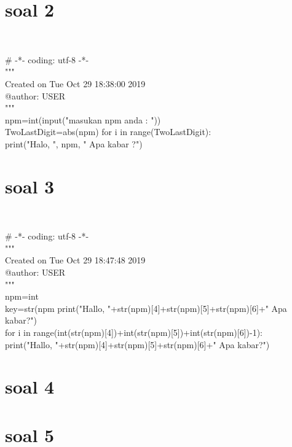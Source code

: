 \begin{enumerate}
\section*{soal 2}\\
\begin{lstlistening}
# -*- coding: utf-8 -*-\\
"""\\
Created on Tue Oct 29 18:38:00 2019\\

@author: USER\\
"""\\

npm=int(input("masukan npm anda : "))\\
TwoLastDigit=abs(npm)%
for i in range(TwoLastDigit):\\
    print("Halo, ", npm, " Apa kabar ?")\\
\end{lstlistening}
\section*{soal 3}\\
\begin{lstlistening}
# -*- coding: utf-8 -*-\\
"""\\
Created on Tue Oct 29 18:47:48 2019\\

@author: USER\\
"""\\

npm=int\\
key=str(npm%
print("Hallo, "+str(npm)[4]+str(npm)[5]+str(npm)[6]+" Apa kabar?")\\

for i in range(int(str(npm)[4])+int(str(npm)[5])+int(str(npm)[6])-1):\\
         print("Hallo, "+str(npm)[4]+str(npm)[5]+str(npm)[6]+" Apa kabar?")\\
\end{lstlistening}
\section*{soal 4}

\section*{soal 5}


\end{enumerate}
